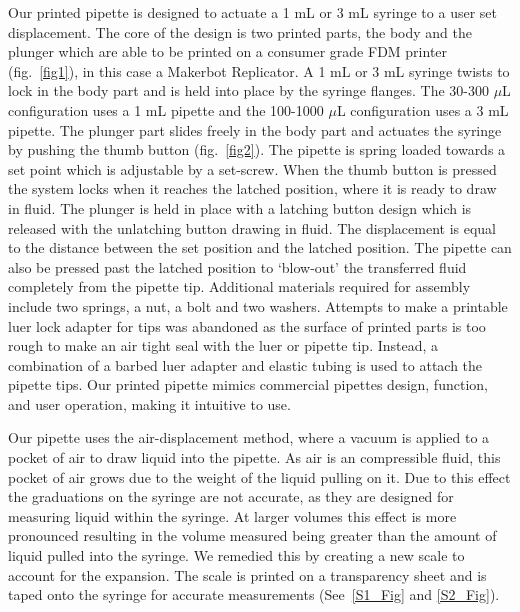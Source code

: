 \documentclass{nature}
\begin{document}
\begin{methods}
Our printed pipette is designed to actuate a 1 mL or 3 mL syringe to a user set displacement.
The core of the design is two printed parts, the body and the plunger which are able to be printed on a consumer grade FDM printer (fig.~\ref{fig1}), in this case a Makerbot Replicator.
A 1 mL or 3 mL syringe twists to lock in the body part and is held into place by the syringe flanges.
The 30-300 $\mu$L configuration uses a 1 mL pipette and the 100-1000 $\mu$L configuration uses a 3 mL pipette.
The plunger part slides freely in the body part and actuates the syringe by pushing the thumb button (fig.~\ref{fig2}). 
The pipette is spring loaded towards a set point which is adjustable by a set-screw.
When the thumb button is pressed the system locks when it reaches the latched position, where it is ready to draw in fluid.
The plunger is held in place with a latching button design which is released with the unlatching button drawing in fluid.
The displacement is equal to the distance between the set position and the latched position.
The pipette can also be pressed past the latched position to `blow-out' the transferred fluid completely from the pipette tip.   
Additional materials required for assembly include two springs, a nut, a bolt and two washers.
Attempts to make a printable luer lock adapter for tips was abandoned as the surface of printed parts is too rough to make an air tight seal with the luer or pipette tip.
Instead, a combination of a barbed luer adapter and elastic tubing is used to attach the pipette tips.
Our printed pipette mimics commercial pipettes design, function, and user operation, making it intuitive to use.

Our pipette uses the air-displacement method, where a vacuum is applied to a pocket of air to draw liquid into the pipette.
As air is an compressible fluid, this pocket of air grows due to the weight of the liquid pulling on it.
Due to this effect the graduations on the syringe are not accurate, as they are designed for measuring liquid within the syringe.
At larger volumes this effect is more pronounced resulting in the volume measured being greater than the amount of liquid pulled into the syringe.
We remedied this by creating a new scale to account for the expansion.
The scale is printed on a transparency sheet and is taped onto the syringe for accurate measurements (See~\ref{S1_Fig} and \ref{S2_Fig}).


\end{methods}
\end{document}
